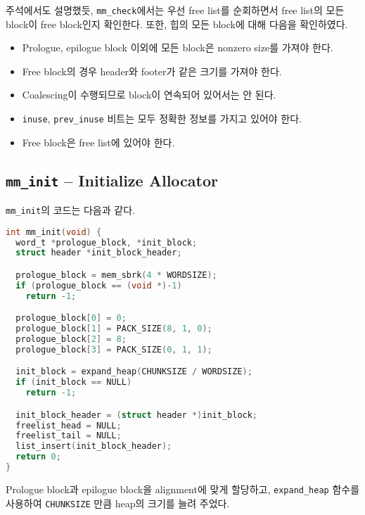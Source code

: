 \documentclass{scrartcl}
\begin{document}
주석에서도 설명했듯, \texttt{mm\_check}에서는 우선 free list를 순회하면서 free
list의 모든 block이 free block인지 확인한다. 또한, 힙의 모든 block에 대해
다음을 확인하였다.
\begin{itemize}
  \item Prologue, epilogue block 이외에 모든 block은 nonzero size를 가져야
    한다.
  \item Free block의 경우 header와 footer가 같은 크기를 가져야 한다.
  \item Coalescing이 수행되므로 block이 연속되어 있어서는 안 된다.
  \item \texttt{inuse}, \texttt{prev\_inuse} 비트는 모두 정확한 정보를 가지고
    있어야 한다.
  \item Free block은 free list에 있어야 한다.
\end{itemize}

\subsection{\texttt{mm\_init} -- Initialize Allocator}
\texttt{mm\_init}의 코드는 다음과 같다.
\begin{lstlisting}[language=C]
int mm_init(void) {
  word_t *prologue_block, *init_block;
  struct header *init_block_header;

  prologue_block = mem_sbrk(4 * WORDSIZE);
  if (prologue_block == (void *)-1)
    return -1;

  prologue_block[0] = 0;
  prologue_block[1] = PACK_SIZE(8, 1, 0);
  prologue_block[2] = 8;
  prologue_block[3] = PACK_SIZE(0, 1, 1);

  init_block = expand_heap(CHUNKSIZE / WORDSIZE);
  if (init_block == NULL)
    return -1;

  init_block_header = (struct header *)init_block;
  freelist_head = NULL;
  freelist_tail = NULL;
  list_insert(init_block_header);
  return 0;
}
\end{lstlisting}
Prologue block과 epilogue block을 alignment에 맞게 할당하고,
\texttt{expand\_heap} 함수를 사용하여 \texttt{CHUNKSIZE} 만큼 heap의 크기를
늘려 주었다.
\end{document}
